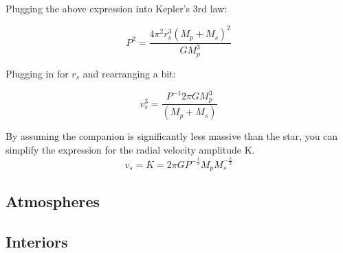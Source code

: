 Plugging the above expression into Kepler's 3rd law:

\begin{equation}
P^2 = \frac{4\pi^2r_s^3(M_p + M_s)^2}{GM_p^3}
\end{equation}

Plugging in for $r_s$ and rearranging a bit:

\begin{equation}
v_s^3 = \frac{P^{-1}2\pi GM_p^3}{(M_p + M_s)}
\end{equation}

By assuming the companion is significantly less massive than the star, you can simplify the expression for the radial velocity amplitude K.  
\begin{equation}
v_s = K = 2\pi G P^{-\frac{1}{3}}M_pM_s^{-\frac{2}{3}}
\end{equation}

\subsection{Atmospheres}
\subsection{Interiors}







